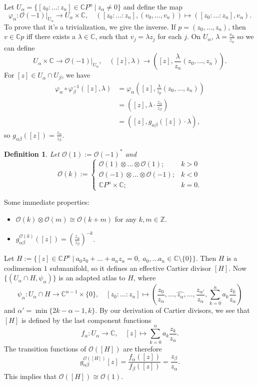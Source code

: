\documentclass[10pt, a4paper]{article}
\newtheorem{defi}[thm]{Definition}
\newenvironment{noticeB}{%
  \tcolorbox[%
  notitle,
  empty,
  enhanced,  %
  breakable,
  coltext=black,
  colback=white, 
  fontupper=\rmfamily,
  noparskip,
  sharp corners,
  boxrule=-1pt,  %
  frame hidden,
  left=7pt,  %
  right=7pt,
  top=5pt,
  bottom=5pt,
  before skip=2.5ex plus 2pt,
  after skip=2.5ex plus 2pt,
  borderline west = {1.5pt}{-0.1pt}{blue!30!black}, %
  overlay unbroken and last={%
    \draw[color=black, line width=1.25pt]
    ($(frame.south west)+(1.pt, -0.1pt)$) -- ++(2em, 0);
  }
  ]}
{\endtcolorbox}
\newenvironment{definition}{\begin{noticeB}\begin{defi}}{%
    \end{defi}\end{noticeB}}
\newcommand{\Z}{\mathbb {Z}}
\newcommand{\C}{\mathbb {C}}
\begin{document}
Let $U_\alpha = \{[z_0: \dots: z_n] \in \C P^n \ |\ z_\alpha \neq 0\}$ and define the map
$$\varphi_\alpha: \mathcal{O} (-1) \big|_{U_\alpha} \to U_\alpha \times \C,\quad ([z_0: \dots : z_n], (v_0, \dots, v_n)) \mapsto ([z_0: \dots : z_n], v_\alpha).$$
To prove that it's a trivialization, we give the inverse. If $p = (z_0, \dots, z_n)$,
then $v \in \C p$ iff there exists a $\lambda \in \C$, such that $v_j = \lambda z_j$ for each $j$.
On $U_\alpha$, $\lambda = \frac{v_\alpha}{z_\alpha}$ so we can define 
$$U_\alpha \times \C \to \mathcal{O}(-1)\big|_{U_\alpha},\quad ([z], \lambda) \to ([z], \frac{\lambda}{z_\alpha} (z_0, \dots, z_n)).$$
For $[z] \in U_\alpha \cap U_\beta$, we have 
\begin{align*}
  \varphi_\alpha \circ \varphi_\beta ^{-1} ([z], \lambda) &= \varphi_\alpha ([z], \frac{\lambda}{z_p} (z_0, \dots, z_n))\\
  &= ([z], \lambda \cdot \frac{z_\alpha}{z_\beta})\\
  &= ([z], g_{\alpha \beta}([z]) \cdot \lambda), 
\end{align*}
so $g_{\alpha \beta}([z]) = \frac{z_\alpha}{z_\beta}$.
\begin{definition}
  Let $\mathcal{O}(1) := \mathcal{O} (-1)^*$ and 
  $$\mathcal{O}(k) := \begin{cases}
    \mathcal{O} (1) \otimes \dots \otimes \mathcal{O} (1); & k > 0\\
    \mathcal{O} (-1) \otimes \dots \otimes \mathcal{O} (-1); & k < 0\\
    \C P^n \times \C; & k = 0.
  \end{cases}$$
\end{definition}

Some immediate properties:
\begin{itemize}
  \item $\mathcal{O} (k) \otimes \mathcal{O}(m) \cong \mathcal{O} (k + m)$ for any $k, m \in \Z$.
  \item $g_{\alpha \beta} ^{\mathcal{O}(k)} ([z]) = \left(\frac{z_\alpha}{z_\beta}\right)^{-k}$.
\end{itemize}
Let $H := \{[z] \in \C P^n\ |\ a_0 z_0 + \dots + a_n z_n = 0,\ a_0, \dots a_n \in \C \setminus \{0\}\}.$
Then $H$ is a codimension $1$ submanifold, so it defines an effective Cartier divisor $[H]$.
Now $\{(U_\alpha \cap H, \psi_\alpha)\}$ is an adapted atlas to $H$, where 
$$\psi_\alpha: U_\alpha \cap H \to \C^{n -1} \times \{0\},\quad [z_0: \dots: z_n] \mapsto 
\left(\frac{z_0}{z_\alpha}, \dots, \widehat{z_\alpha}, \dots, \frac{z_{\alpha'}}{z_\alpha}, \sum_{k = 0} ^n a_k \frac{z_k}{z_\alpha} \right)$$
and $\alpha' = \min \{2k - \alpha - 1, k\}$.
By our derivation of Cartier divisors, we see that $[H]$ is defined by the last component functions
$$f_\alpha: U_\alpha  \to \C,\quad [z] \mapsto \sum_{k = 0} ^n a_k \frac{z_k}{z_\alpha}.$$
The transition functions of $\mathcal{O} ([H])$ are therefore
$$g_{\alpha \beta} ^{\mathcal{O} ([H])} [z] = \frac{f_\alpha ([z])}{f_\beta ([z])} = \frac{z_\beta}{z_\alpha}.$$
This implies that $\mathcal{O}([H]) \cong \mathcal{O}(1)$.
\end{document}
